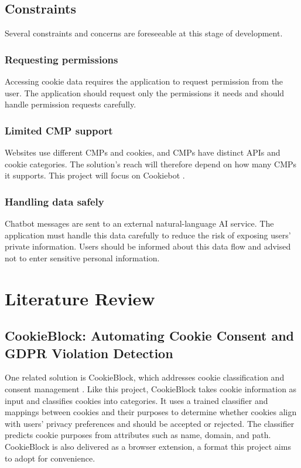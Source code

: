 \documentclass[11pt,a4paper]{report}
\begin{document}
\section{Constraints}
Several constraints and concerns are foreseeable at this stage of development.
\subsection{Requesting permissions}
Accessing cookie data requires the application to request permission from the user. The application should request only the permissions it needs and should handle permission requests carefully.

\subsection{Limited CMP support}
\label{subsec:supporting-limited-cmps}
Websites use different CMPs and cookies, and CMPs have distinct APIs and cookie categories. The solution's reach will therefore depend on how many CMPs it supports. This project will focus on Cookiebot \cite{noauthor_undated-ze}.
\subsection{Handling data safely}
Chatbot messages are sent to an external natural-language AI service. The application must handle this data carefully to reduce the risk of exposing users' private information. Users should be informed about this data flow and advised not to enter sensitive personal information.
\chapter{Literature Review}
\section{CookieBlock: Automating Cookie Consent and GDPR Violation Detection}
One related solution is CookieBlock, which addresses cookie classification and consent management \cite{noauthor_undated-pu}. Like this project, CookieBlock takes cookie information as input and classifies cookies into categories. It uses a trained classifier and mappings between cookies and their purposes to determine whether cookies align with users' privacy preferences and should be accepted or rejected. The classifier predicts cookie purposes from attributes such as name, domain, and path. CookieBlock is also delivered as a browser extension, a format this project aims to adopt for convenience.
\end{document}
